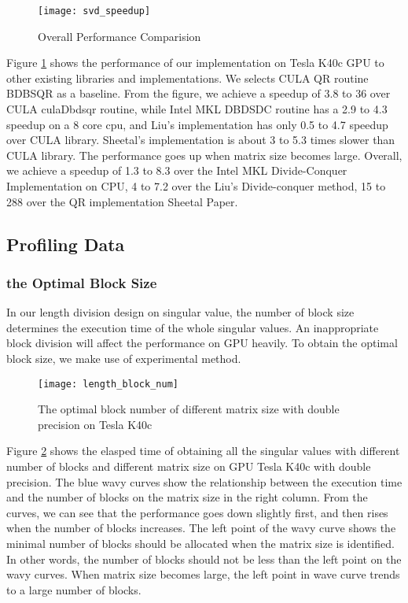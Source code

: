 \begin{figure}[hbpt]
\centering
\texttt{[image: svd\_speedup]}
\caption{Overall Performance Comparision}
\label{fig:svd_speedup}
\end{figure}
Figure \ref{fig:svd_speedup} shows the performance of our implementation on Tesla K40c GPU to other existing libraries and implementations.
We selects CULA QR routine BDBSQR as a baseline.
From the figure, we achieve a speedup of 3.8 to 36 over CULA culaDbdsqr routine,
while Intel MKL DBDSDC routine has a 2.9 to 4.3 speedup on a 8 core cpu, and Liu's implementation has only 0.5 to 4.7 speedup over CULA library.
Sheetal's implementation is about 3 to 5.3 times slower than CULA library.
The performance goes up when matrix size becomes large.
Overall, we achieve a speedup of 1.3 to 8.3 over the Intel MKL Divide-Conquer Implementation on CPU, 4 to 7.2 over the Liu's Divide-conquer method, 15 to 288 over the QR implementation Sheetal Paper.

\subsection{Profiling Data}

\subsubsection{the Optimal Block Size}
In our length division design on singular value, the number of block size determines the execution time of the whole singular values.
An inappropriate block division will affect the performance on GPU heavily.
To obtain the optimal block size, we make use of experimental method. 

\begin{figure}[hbpt]
\centering
\texttt{[image: length\_block\_num]}
\caption{The optimal block number of different matrix size with double precision on Tesla K40c}
\label{fig:length_block_num}
\end{figure}
Figure \ref{fig:length_block_num} shows the elasped time of obtaining all the singular values with different number of blocks and different matrix size on GPU Tesla K40c with double precision.
The blue wavy curves show the relationship between the execution time and the number of blocks on the matrix size in the right column.
From the curves, we can see that the performance goes down slightly first, and then rises when the number of blocks increases.
The left point of the wavy curve shows the minimal number of blocks should be allocated when the matrix size is identified.
In other words, the number of blocks should not be less than the left point on the wavy curves.
When matrix size becomes large, the left point in wave curve trends to a large number of blocks.

